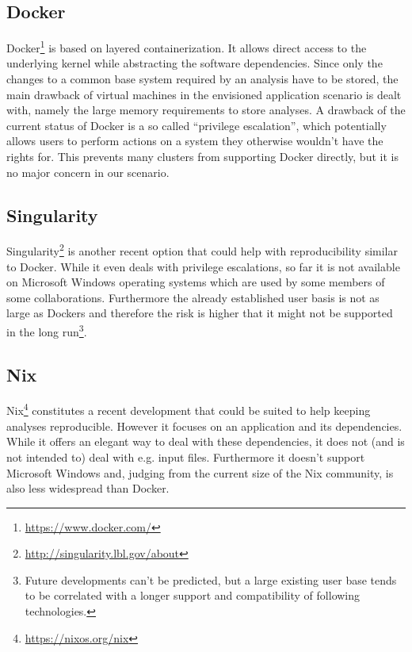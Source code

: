 \documentclass[a4paper, twoside, 11pt]{article}
\begin{document}
\subsection{Docker}

Docker\footnote{\url{https://www.docker.com/}} is based on layered containerization. It allows direct access 
to the underlying kernel while abstracting the software dependencies. 
Since only the changes to a common base system required by an analysis have to be stored, 
the main drawback of virtual machines in the envisioned application scenario is dealt with, 
namely the large memory requirements to store analyses. 
A drawback of the current status of Docker is a so called ``privilege escalation'', 
which potentially allows users to perform actions on a system they otherwise wouldn't have the rights for. 
This prevents many clusters from supporting Docker directly, but it is no major concern in our scenario. 


\subsection{Singularity}

Singularity\footnote{\url{http://singularity.lbl.gov/about}} is another recent
option that could help with reproducibility similar to Docker. 
While it even deals with privilege escalations, 
so far it is not available on Microsoft Windows operating systems which are used by some members of some collaborations. 
Furthermore the already established user basis is not as large as Dockers 
and therefore the risk is higher that it might not be supported 
in the long run\footnote{Future developments can't be predicted, but a large existing user base tends to be 
correlated with a longer support and compatibility of following technologies.}. 


\subsection{Nix}

Nix\footnote{\url{https://nixos.org/nix}} constitutes a recent development that could be suited to help keeping analyses reproducible. 
However it focuses on an application and its dependencies. 
While it offers an elegant way to deal with these dependencies, it does not (and is not intended to) deal with e.g. input files. 
Furthermore it doesn't support Microsoft Windows and, 
judging from the current size of the Nix community, is also less widespread than Docker. 
\end{document}
